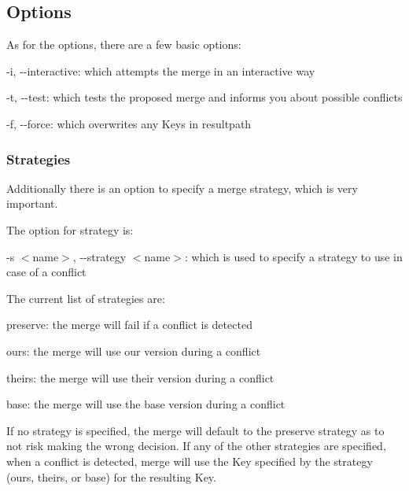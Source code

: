 \subsection*{Options}

As for the options, there are a few basic options\+:


\begin{DoxyItemize}
\item {\ttfamily -\/i}, {\ttfamily -\/-\/interactive}\+: which attempts the merge in an interactive way
\item {\ttfamily -\/t}, {\ttfamily -\/-\/test}\+: which tests the proposed merge and informs you about possible conflicts
\item {\ttfamily -\/f}, {\ttfamily -\/-\/force}\+: which overwrites any Keys in {\ttfamily resultpath}
\end{DoxyItemize}

\subsubsection*{Strategies}

Additionally there is an option to specify a merge strategy, which is very important.

The option for strategy is\+:


\begin{DoxyItemize}
\item {\ttfamily -\/s $<$name$>$}, {\ttfamily -\/-\/strategy $<$name$>$}\+: which is used to specify a strategy to use in case of a conflict
\end{DoxyItemize}

The current list of strategies are\+:


\begin{DoxyItemize}
\item {\ttfamily preserve}\+: the merge will fail if a conflict is detected
\item {\ttfamily ours}\+: the merge will use our version during a conflict
\item {\ttfamily theirs}\+: the merge will use their version during a conflict
\item {\ttfamily base}\+: the merge will use the base version during a conflict
\end{DoxyItemize}

If no strategy is specified, the merge will default to the preserve strategy as to not risk making the wrong decision. If any of the other strategies are specified, when a conflict is detected, merge will use the Key specified by the strategy ({\ttfamily ours}, {\ttfamily theirs}, or {\ttfamily base}) for the resulting Key.

